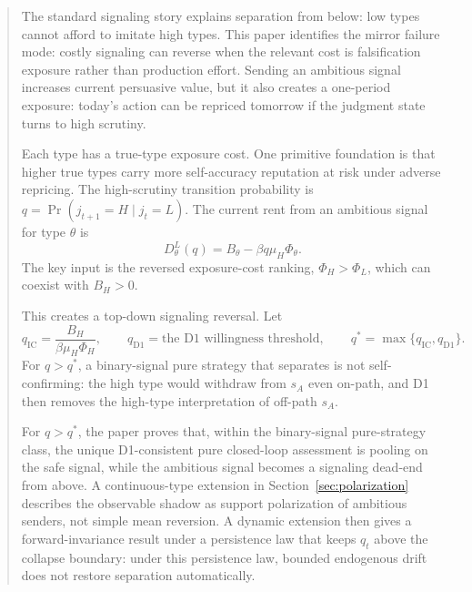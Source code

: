 
\begin{abstract}
The standard signaling story explains separation from below: low types cannot afford to imitate high types. This paper identifies the mirror failure mode: costly signaling can reverse when the relevant cost is falsification exposure rather than production effort. Sending an ambitious signal increases current persuasive value, but it also creates a one-period exposure: today's action can be repriced tomorrow if the judgment state turns to high scrutiny.

Each type has a true-type exposure cost. One primitive foundation is that higher true types carry more self-accuracy reputation at risk under adverse repricing. The high-scrutiny transition probability is $q=\Pr(j_{t+1}=H\mid j_t=L)$. The current rent from an ambitious signal for type $\theta$ is
\[
D_\theta^L(q)=B_\theta-\beta q\mu_H\Phi_\theta.
\]
The key input is the reversed exposure-cost ranking, $\Phi_H>\Phi_L$, which can coexist with $B_H>0$.

This creates a top-down signaling reversal. Let
\[
q_{\mathrm{IC}}=\frac{B_H}{\beta\mu_H\Phi_H},
\qquad
q_{\mathrm{D1}}=\text{the D1 willingness threshold},
\qquad
q^*=\max\{q_{\mathrm{IC}},q_{\mathrm{D1}}\}.
\]
For $q>q^*$, a binary-signal pure strategy that separates is not self-confirming: the high type would withdraw from $s_A$ even on-path, and D1 then removes the high-type interpretation of off-path $s_A$.

For $q>q^*$, the paper proves that, within the binary-signal pure-strategy class, the unique D1-consistent pure closed-loop assessment is pooling on the safe signal, while the ambitious signal becomes a signaling dead-end from above. A continuous-type extension in Section~\ref{sec:polarization} describes the observable shadow as support polarization of ambitious senders, not simple mean reversion. A dynamic extension then gives a forward-invariance result under a persistence law that keeps $q_t$ above the collapse boundary: under this persistence law, bounded endogenous drift does not restore separation automatically.
\end{abstract}
